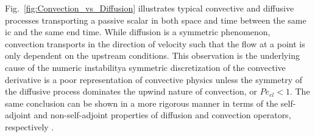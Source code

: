 Fig.\ \ref{fig:Convection_vs_Diffusion} illustrates typical convective and diffusive processes transporting a passive scalar in both space and time between the same \gls{ic} and the same end time. While diffusion is a symmetric phenomenon, convection transports in the direction of velocity such that the flow at a point is only dependent on the upstream conditions. This observation is the underlying cause of the numeric instability\mdash a symmetric discretization of the convective derivative is a poor representation of convective physics unless the symmetry of the diffusive process dominates the upwind nature of convection, or \(Pe_{el}<1\). The same conclusion can be shown in a more rigorous manner in terms of the self-adjoint and non-self-adjoint properties of diffusion and convection operators, respectively \cite{zienkiewicz}.

